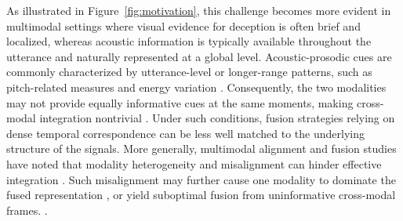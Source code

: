 \documentclass[sigconf,screen,review,anonymous]{acmart}
\begin{document}
As illustrated in Figure~\ref{fig:motivation}, this challenge becomes more evident in multimodal settings where visual evidence for deception is often brief and localized, whereas acoustic information is typically available throughout the utterance and naturally represented at a global level. Acoustic-prosodic cues are commonly characterized by utterance-level or longer-range patterns, such as pitch-related measures and energy variation \cite{chen2020acoustic, levitan2018acoustic}. Consequently, the two modalities may not provide equally informative cues at the same moments, making cross-modal integration nontrivial \cite{baltruvsaitis2018multimodal, zhang2025large}. Under such conditions, fusion strategies relying on dense temporal correspondence can be less well matched to the underlying structure of the signals. More generally, multimodal alignment and fusion studies have noted that modality heterogeneity and misalignment can hinder effective integration \cite{baltruvsaitis2018multimodal, li2024multimodal, tsai2019multimodal}. Such misalignment may further cause one modality to dominate the fused representation \cite{zadeh2017tensor, hazarika2020misa}, or yield suboptimal fusion from uninformative cross-modal frames. \cite{arevalo2017gated, joze2020mmtm}.
\end{document}
